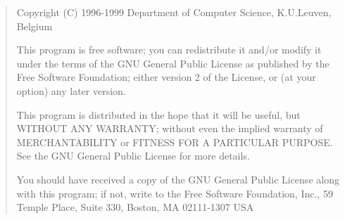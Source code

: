 \newpage

\vspace*{80mm}

\begin{license} \begin{quotation}
\noindent
Copyright (C) 1996-1999 Department of Computer Science, K.U.Leuven, Belgium

\noindent
This program is free software; you can redistribute it and/or modify
it under the terms of the GNU General Public License as published by
the Free Software Foundation; either version 2 of the License, or
(at your option) any later version.

\noindent
This program is distributed in the hope that it will be useful,
but WITHOUT ANY WARRANTY; without even the implied warranty of
MERCHANTABILITY or FITNESS FOR A PARTICULAR PURPOSE.  See the
GNU General Public License for more details.

\noindent
You should have received a copy of the GNU General Public License
along with this program; if not, write to the Free Software
Foundation, Inc., 59 Temple Place, Suite 330, Boston, MA  02111-1307  USA
\end{quotation} \end{license}

\newpage

\tableofcontents

